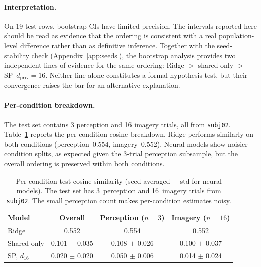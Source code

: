 \documentclass{article}
\begin{document}
\paragraph{Interpretation.}
On 19 test rows, bootstrap CIs have limited precision.  The intervals reported
here should be read as evidence that the ordering is consistent with a
real population-level difference rather than as definitive inference.  Together
with the seed-stability check (Appendix~\ref{app:seeds}), the bootstrap
analysis provides two independent lines of evidence for the same ordering:
Ridge $>$ shared-only $>$ SP~$d_\mathrm{priv}\!=\!16$.  Neither line alone
constitutes a formal hypothesis test, but their convergence raises the bar for
an alternative explanation.

\paragraph{Per-condition breakdown.}
The test set contains 3 perception and 16 imagery trials, all from
\texttt{subj02}.  Table~\ref{tab:percond} reports the per-condition cosine
breakdown.  Ridge performs similarly on both conditions (perception~0.554,
imagery~0.552).  Neural models show noisier condition splits, as expected given
the 3-trial perception subsample, but the overall ordering is preserved within
both conditions.

\begin{table}[h]
  \centering
  \footnotesize
  \caption{Per-condition test cosine similarity (seed-averaged $\pm$ std for
  neural models).  The test set has 3~perception and 16~imagery trials from
  \texttt{subj02}.  The small perception count makes per-condition estimates
  noisy.}
  \label{tab:percond}
  \begin{tabular}{@{}lccc@{}}
    \toprule
    Model & Overall & Perception ($n\!=\!3$) & Imagery ($n\!=\!16$) \\
    \midrule
    Ridge & 0.552 & 0.554 & 0.552 \\
    Shared-only & 0.101 $\pm$ 0.035 & 0.108 $\pm$ 0.026 & 0.100 $\pm$ 0.037 \\
    SP, $d_{16}$ & 0.020 $\pm$ 0.020 & 0.050 $\pm$ 0.006 & 0.014 $\pm$ 0.024 \\
    \bottomrule
  \end{tabular}
\end{table}


\end{document}
